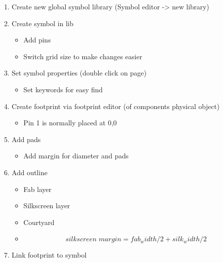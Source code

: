\documentclass[11pt]{scrartcl} %
\begin{document}
\begin{enumerate}
	\item Create new global symbol library (Symbol editor -> new library)
	\item Create symbol in lib
	\begin{itemize}
		\item Add pins
		\item Switch grid size to make changes easier
	\end{itemize}
	\item Set symbol properties (double click on page)
	\begin{itemize}
		\item Set keywords for easy find
	\end{itemize}
	\item Create footprint via footprint editor (of components physical object)
	\begin{itemize}
		\item Pin 1 is normally placed at 0,0
	\end{itemize}
	\item Add pads
	\begin{itemize}
		\item Add margin for diameter and pads
	\end{itemize}
	\item Add outline
	\begin{itemize}
		\item Fab layer
		\item Silkscreen layer
		\item Courtyard
		\item \[ silkscreen\;margin = fab_width/2 + silk_width/2 \] 
	\end{itemize}
	\item Link footprint to symbol
\end{enumerate}


\end{document}
